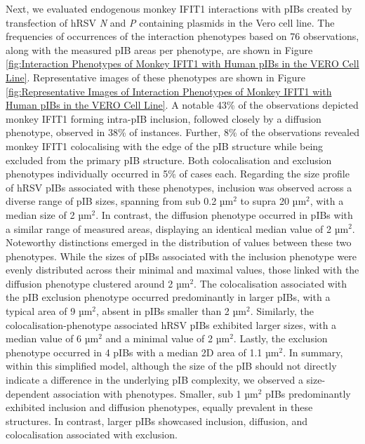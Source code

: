 Next, we evaluated endogenous monkey IFIT1 interactions with pIBs created by transfection of hRSV \textit{N} and \textit{P} containing plasmids in the Vero cell line. The frequencies of occurrences of the interaction phenotypes based on 76 observations, along with the measured pIB areas per phenotype, are shown in Figure \ref{fig:Interaction Phenotypes of Monkey IFIT1 with Human pIBs in the VERO Cell Line}. Representative images of these phenotypes are shown in Figure \ref{fig:Representative Images of Interaction Phenotypes of Monkey IFIT1 with Human pIBs in the VERO Cell Line}. A notable 43\% of the observations depicted monkey IFIT1 forming intra-pIB inclusion, followed closely by a diffusion phenotype, observed in 38\% of instances. Further, 8\% of the observations revealed monkey IFIT1 colocalising with the edge of the pIB structure while being excluded from the primary pIB structure. Both colocalisation and exclusion phenotypes individually occurred in 5\% of cases each. Regarding the size profile of hRSV pIBs associated with these phenotypes, inclusion was observed across a diverse range of pIB sizes, spanning from sub 0.2 \(\mbox{µm}^2\) to supra 20 \(\mbox{µm}^2\), with a median size of 2 \(\mbox{µm}^2\). In contrast, the diffusion phenotype occurred in pIBs with a similar range of measured areas, displaying an identical median value of 2 \(\mbox{µm}^2\). Noteworthy distinctions emerged in the distribution of values between these two phenotypes. While the sizes of pIBs associated with the inclusion phenotype were evenly distributed across their minimal and maximal values, those linked with the diffusion phenotype clustered around 2 \(\mbox{µm}^2\). The colocalisation associated with the pIB exclusion phenotype occurred predominantly in larger pIBs, with a typical area of 9 \(\mbox{µm}^2\), absent in pIBs smaller than 2 \(\mbox{µm}^2\). Similarly, the colocalisation-phenotype associated hRSV pIBs exhibited larger sizes, with a median value of 6 \(\mbox{µm}^2\) and a minimal value of 2 \(\mbox{µm}^2\). Lastly, the exclusion phenotype occurred in 4 pIBs with a median 2D area of 1.1 \(\mbox{µm}^2\). In summary, within this simplified model, although the size of the pIB should not directly indicate a difference in the underlying pIB complexity, we observed a size-dependent association with phenotypes. Smaller, sub 1 \(\mbox{µm}^2\) pIBs predominantly exhibited inclusion and diffusion phenotypes, equally prevalent in these structures. In contrast, larger pIBs showcased inclusion, diffusion, and colocalisation associated with exclusion.

